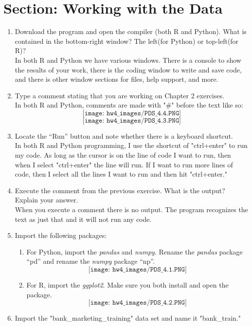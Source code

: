 \documentclass[11pt]{article}
\theoremstyle{definition}
\newcommand{\1}[1]{\mathbf{1} \left \{ #1 \right \}}
\begin{document}
\section{Section: Working with the Data}
\begin{enumerate}\addtocounter{enumi}{8}
    \item Download the program and open the compiler (both R and Python). What is contained in the bottom-right window? The left(for Python) or top-left(for R)? \\
    In both R and Python we have various windows.  There is a console to show the results of your work, there is the coding window to write and save code, and there is other window sections for files, help support, and more.
    \item Type a comment stating that you are working on Chapter 2 exercises. \\
    In both R and Python, comments are made with "\#" before the text like so:
    \[\texttt{[image: hw4\_images/PDS\_4.4.PNG]}\]
    \[\texttt{[image: hw4\_images/PDS\_4.3.PNG]}\]
    \item Locate the “Run” button and note whether there is a keyboard shortcut. \\
    In both R and Python programming, I use the shortcut of "ctrl+enter" to run my code.  As long as the cursor is on the line of code I want to run, then when I select "ctrl+enter" the line will run.  If I want to run more lines of code, then I select all the lines I want to run and then hit "ctrl+enter."
    \item Execute the comment from the previous exercise. What is the output? Explain your answer. \\
    When you execute a comment there is no output.  The program recognizes the text as just that and it will not run any code.
    \item Import the following packages:
    \begin{enumerate}[(1)]
        \item For Python, import the \textit{pandas} and \textit{numpy}. Rename the \textit{pandas} package “pd” and rename the \textit{numpy} package “np”.
        \[\texttt{[image: hw4\_images/PDS\_4.1.PNG]}\]
        \item For R, import the \textit{ggplot2}. Make sure you both install and open the package.
        \[\texttt{[image: hw4\_images/PDS\_4.2.PNG]}\]
    \end{enumerate}
    \item Import the "bank\_marketing\_training" data set and name it "bank\_train."

\end{enumerate}
\end{document}
